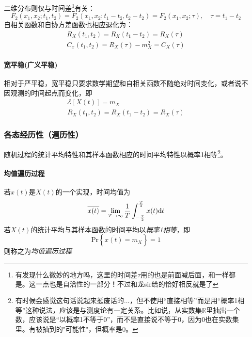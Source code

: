         二维分布则仅与时间差\footnote{有发现什么微妙的地方吗，这里的时间差$\tau$用的也是前面减后面，和一样都是。这一点也是\textcolor{bupt}{自洽性}的一部分！不过和龙sir给的恰好相反就是了}有关：
        \begin{equation}
            F_2(x_1,x_2;t_1,t_2)=F_2(x_1,x_2;t_1-t_2,t_2-t_2)=F_2(x_1,x_2;\tau),\hspace{1em}\tau=t_1-t_2
        \end{equation}
        自相关函数和自协方差函数也相应退化为：
        \begin{align}
            R_X(t_1,t_2)=R_X(t_1-t_2)=R_X(\tau)\\
            C_x(t_1,t_2)=R_X(\tau)-m_X^2=C_X(\tau)
        \end{align}

        \paragraph{宽平稳(广义平稳)}
        相对于严平稳，宽平稳只要求数学期望和自相关函数不随绝对时间变化，或者说不因观测的时间起点而变化，即
        \begin{align}
            \mathscr{E}[X(t)]=m_X\hspace{5em}\\
            R_X(t_1,t_2)=R_X(t_1-t_2)=R_X(\tau)
        \end{align}

    \subsubsection[各态经历性]{各态经历性（遍历性）}
    随机过程的统计平均特性和其样本函数相应的时间平均特性以概率1相等\footnote{有时候会感觉这句话说起来挺废话的$\ldots$，但不使用“直接相等”而是用“概率1相等”这种说法，应该是与测度论有一定关系。比如说，从实数集$\mathbb{R}$里抽出一个数，应该说是“以概率1不等于0”，而不是直接说不等于0，因为0也在实数集里。有被抽到的"可能性"，但概率是0。}。

    \paragraph{均值遍历过程}\mbox{}

    若$x(t)$是$X(t)$的一个实现，时间均值为
    \begin{equation}
        \overline{x(t)}=\lim_{T\to\infty}\frac{1}{T}\int_{-\frac{T}{2}}^{\frac{T}{2}}x(t)\text{\upshape d} t
    \end{equation}
    若$X(t)$的统计平均与其样本函数的时间平均以\emph{概率1相等}，即
    \begin{equation}
        \text{Pr}\left\{\overline{x(t)}=m_X \right\}=1
    \end{equation}
    则称之为\emph{均值遍历过程}

